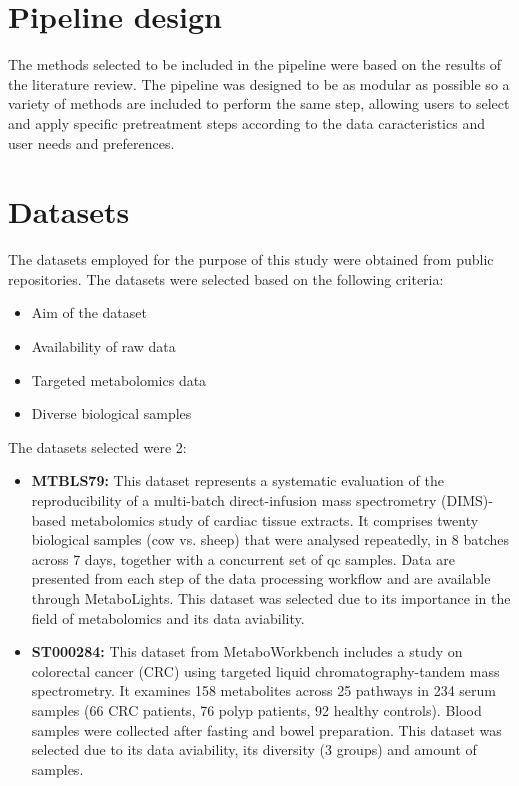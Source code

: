 \documentclass[ENG, BIB]{TFUOC}%
\begin{document}
\section{Pipeline design}
The methods selected to be included in the pipeline were based on the results of the literature review. The pipeline was designed to be as modular as possible so a variety of methods are included to perform the same step, allowing users to select and apply specific pretreatment steps according to the data caracteristics and user needs and preferences.

\section{Datasets}
The datasets employed for the purpose of this study were obtained from public repositories. The datasets were selected based on the following criteria:
\begin{itemize}
    \item Aim of the dataset
    \item Availability of raw data
    \item Targeted metabolomics data
    \item Diverse biological samples
\end{itemize}

The datasets selected were 2:
\begin{itemize}
    \item \textbf{MTBLS79:} \cite{kirwanDirectInfusionMass2014} This dataset represents a systematic evaluation of the reproducibility of a multi-batch direct-infusion mass spectrometry (DIMS)-based metabolomics study of cardiac tissue extracts. It comprises twenty biological samples (cow vs. sheep) that were analysed repeatedly, in 8 batches across 7 days, together with a concurrent set of \gls{qc} samples. Data are presented from each step of the data processing workflow and are available through MetaboLights. This dataset was selected due to its importance in the field of metabolomics and its data aviability.
    \item \textbf{ST000284:} \cite{zhuColorectalCancerDetection2014} This dataset from MetaboWorkbench includes a study on colorectal cancer (CRC) using targeted liquid chromatography-tandem mass spectrometry. It examines 158 metabolites across 25 pathways in 234 serum samples (66 CRC patients, 76 polyp patients, 92 healthy controls). Blood samples were collected after fasting and bowel preparation. This dataset was selected due to its data aviability, its diversity (3 groups) and amount of samples.

\end{itemize}
\end{document}
